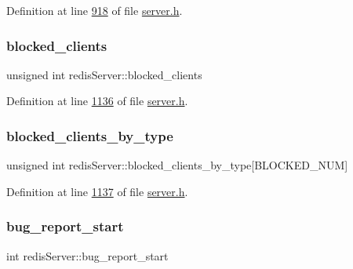 Definition at line \hyperlink{server_8h_source_l00918}{918} of file \hyperlink{server_8h_source}{server.\+h}.

\mbox{\label{structredisServer_a30c11e437227673c7ccdb1bc68a1ac94}} 
\subsubsection{\texorpdfstring{blocked\+\_\+clients}{blocked\_clients}}
{\footnotesize\ttfamily unsigned int redis\+Server\+::blocked\+\_\+clients}



Definition at line \hyperlink{server_8h_source_l01136}{1136} of file \hyperlink{server_8h_source}{server.\+h}.

\mbox{\label{structredisServer_a1acd8236b212b370b44ef3d5d0d74cd4}} 
\subsubsection{\texorpdfstring{blocked\+\_\+clients\+\_\+by\+\_\+type}{blocked\_clients\_by\_type}}
{\footnotesize\ttfamily unsigned int redis\+Server\+::blocked\+\_\+clients\+\_\+by\+\_\+type\mbox{[}B\+L\+O\+C\+K\+E\+D\+\_\+\+N\+UM\mbox{]}}



Definition at line \hyperlink{server_8h_source_l01137}{1137} of file \hyperlink{server_8h_source}{server.\+h}.

\mbox{\label{structredisServer_a111b9872ed4e15355f806ff0811bee64}} 
\subsubsection{\texorpdfstring{bug\+\_\+report\+\_\+start}{bug\_report\_start}}
{\footnotesize\ttfamily int redis\+Server\+::bug\+\_\+report\+\_\+start}



